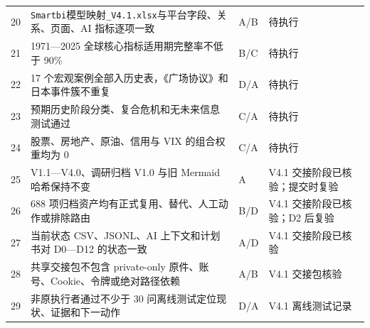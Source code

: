 \documentclass[UTF8,fontset=windows,12pt,openany]{ctexbook}
\newcommand{\File}[1]{{\small\begingroup\urlstyle{same}\nolinkurl{#1}\endgroup}}
\begin{document}
\begin{longtable}{p{1.4cm}p{9.1cm}p{1.8cm}p{1.8cm}}
20 & \File{Smartbi}\textsf{模型映射}\File{_V4.1.xlsx}与平台字段、关系、页面、AI 指标逐项一致 & A/B & 待执行\\
21 & 1971—2025 全球核心指标适用期完整率不低于 90\% & B/C & 待执行\\
22 & 17 个宏观案例全部入历史表，《广场协议》和日本事件簇不重复 & D/A & 待执行\\
23 & 预期历史阶段分类、复合危机和无未来信息测试通过 & C/A & 待执行\\
24 & 股票、房地产、原油、信用与 VIX 的组合权重均为 0 & C/A & 待执行\\
25 & V1.1—V4.0、调研归档 V1.0 与旧 Mermaid 哈希保持不变 & A & V4.1 交接阶段已核验；提交时复验\\
26 & 688 项归档资产均有正式复用、替代、人工动作或排除路由 & B/D & V4.1 交接阶段已核验；D2 后复验\\
27 & 当前状态 CSV、JSONL、AI 上下文和计划书对 D0—D12 的状态一致 & A/D & V4.1 交接阶段已核验\\
28 & 共享交接包不包含 private-only 原件、账号、Cookie、令牌或绝对路径依赖 & A/B & V4.1 交接包核验\\
29 & 非原执行者通过不少于 30 问离线测试定位现状、证据和下一动作 & D/A & V4.1 离线测试记录\\
\bottomrule
\end{longtable}

\backmatter
\end{document}
